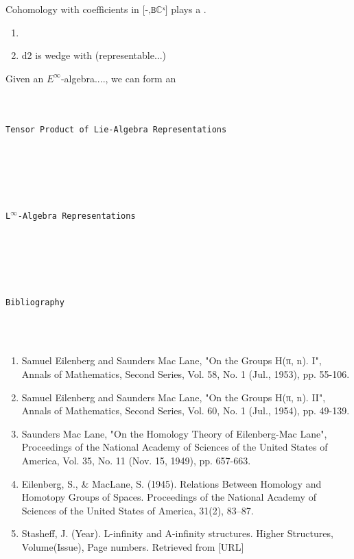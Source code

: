 \documentclass{book}
\theoremstyle{definition}
\renewcommand{\chapter}[1]{
\newpage
{
\Huge 
\begin{center}
\ \\
\ \\
\thispagestyle{empty}
\texttt{#1}
\end{center}}
\ \\
\ \\
}
\begin{document}
Cohomology with coefficients in $\texttt{[-,Bℂˣ]}$ plays a .\\

\begin{enumerate}
\item 
\item d2 is wedge with (representable...)
\end{enumerate}

Given an $E^{\infty}$-algebra...., we can form an \\

\newpage
\chapter{Tensor Product of Lie-Algebra Representations}




\newpage
\chapter{L${}^{\infty}$-Algebra Representations}




\newpage
\chapter{Bibliography}

\begin{enumerate}
\item Samuel Eilenberg and Saunders Mac Lane, "On the Groups H(π, n). I", Annals of Mathematics, Second Series, Vol. 58, No. 1 (Jul., 1953), pp. 55-106.
\item Samuel Eilenberg and Saunders Mac Lane, "On the Groups H(π, n). II", Annals of Mathematics, Second Series, Vol. 60, No. 1 (Jul., 1954), pp. 49-139.
\item Saunders Mac Lane, "On the Homology Theory of Eilenberg-Mac Lane", Proceedings of the National Academy of Sciences of the United States of America, Vol. 35, No. 11 (Nov. 15, 1949), pp. 657-663.
\item Eilenberg, S., \& MacLane, S. (1945). Relations Between Homology and Homotopy Groups of Spaces. Proceedings of the National Academy of Sciences of the United States of America, 31(2), 83–87. 
\item Stasheff, J. (Year). L-infinity and A-infinity structures. Higher Structures, Volume(Issue), Page numbers. Retrieved from [URL]
\end{enumerate}
\end{document}
